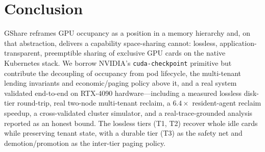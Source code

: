 \documentclass[preprint,12pt]{elsarticle}
\begin{document}
\section{Conclusion}
\label{sec:conclusion}
GShare reframes GPU occupancy as a position in a memory hierarchy and, on that abstraction, delivers a
capability space-sharing cannot: lossless, application-transparent, preemptible sharing of exclusive GPU
cards on the native Kubernetes stack. We borrow NVIDIA's \texttt{cuda-checkpoint} primitive but contribute
the decoupling of occupancy from pod lifecycle, the multi-tenant lending invariants and economic/paging
policy above it, and a real system validated end-to-end on RTX-4090 hardware---including a measured
lossless disk-tier round-trip, real two-node multi-tenant reclaim, a $6.4\times$ resident-agent reclaim
speedup, a cross-validated cluster simulator, and a real-trace-grounded analysis reported as an honest
bound. The lossless tiers (T1, T2) recover whole idle cards while preserving tenant state, with a durable
tier (T3) as the safety net and demotion/promotion as the inter-tier paging policy.



\end{document}
